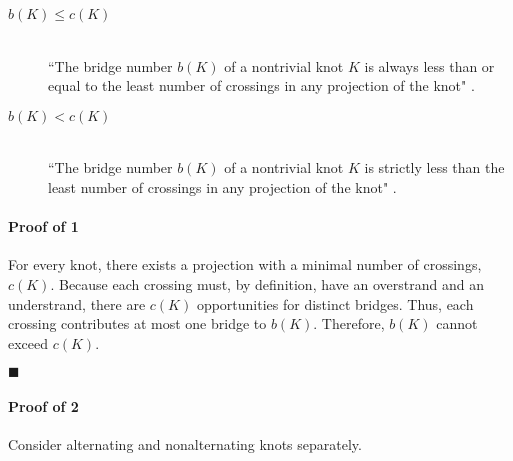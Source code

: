 \documentclass[titlepage]{article}
\newcommand{\dq}[4][]{``#2"#1 \cite[#4]{#3}.}
\newcommand{\qed}{
    \begin{flushright}
        $\blacksquare$
    \end{flushright}
}
\begin{document}
\begin{theor}
    \begin{description}
        \item[$b(K)\leq c(K)$] \hfill \\ \dq{The bridge number $b(K)$ of a nontrivial knot $K$ is always less than or equal to the least number of crossings in any projection of the knot}{bib:knotbook}{65}
        \item[$b(K)<c(K)$] \hfill \\ \dq{The bridge number $b(K)$ of a nontrivial knot $K$ is strictly less than the least number of crossings in any projection of the knot}{bib:knotbook}{65}
    \end{description}
\end{theor}

\paragraph{\textbf{Proof of 1}} For every knot, there exists a projection with a minimal number of crossings, $c(K)$. Because each crossing must, by definition, have an overstrand and an understrand, there are $c(K)$ opportunities for distinct bridges. Thus, each crossing contributes at most one bridge to $b(K)$. Therefore, $b(K)$ cannot exceed $c(K)$.
\qed
\paragraph{\textbf{Proof of 2}} Consider alternating and nonalternating knots separately.
\end{document}
